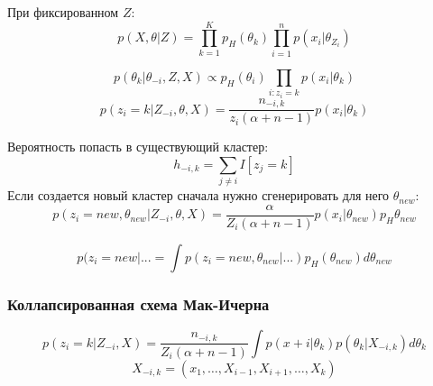 При фиксированном $Z$:
$$ p(X, \theta | Z) = \prod_{k=1}^K p_H(\theta_k) \prod_{i=1}^n p(x_i|\theta_{Z_i}) $$

$$ p(\theta_k|\theta_{-i}, Z, X) \propto p_H(\theta_i) \prod_{i:z_i=k}p(x_i|\theta_k) $$
$$ p(z_i=k|Z_{-i}, \theta, X) = \frac{n_{-i,k}}{z_i (\alpha+n-1)}p(x_i|\theta_k) $$

Вероятность попасть в существующий кластер:
$$ h_{-i,k} = \sum_{j \neq i} I[z_j=k] $$
Если создается новый кластер сначала нужно сгенерировать для него $\theta_{new}$:
$$ p(z_i=new, \theta_{new} | Z_{-i}, \theta, X) = \frac{\alpha}{Z_i (\alpha+n-1)} p(x_i|\theta_{new})p_H{\theta_{new}} $$

$$p(z_i=new|... = \int p(z_i=new, \theta_{new}| ...)p_H(\theta_{new}) d\theta_{new} $$


\subsubsection{Коллапсированная схема Мак-Ичерна}

$$ p(z_i=k | Z_{-i}, X) = \frac{n_{-i,k}}{Z_i (\alpha+n-1)} \int p(x+i|\theta_k) p(\theta_k|X_{-i,k}) d\theta_k$$
$$ X_{-i,k} = (x_1, \ldots, X_{i-1}, X_{i+1}, \ldots, X_k) $$